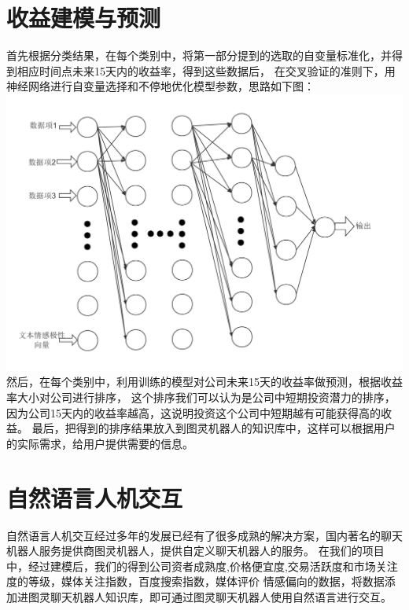 \documentclass[UTF8]{ctexart}
\begin{document}
\section{收益建模与预测}
首先根据分类结果，在每个类别中，将第一部分提到的选取的自变量标准化，并得到相应时间点未来15天内的收益率，得到这些数据后，
在交叉验证的准则下，用神经网络进行自变量选择和不停地优化模型参数，思路如下图：\\
\includegraphics[scale=0.3]{pic1.pdf}
\\然后，在每个类别中，利用训练的模型对公司未来15天的收益率做预测，根据收益率大小对公司进行排序，
这个排序我们可以认为是公司中短期投资潜力的排序，因为公司15天内的收益率越高，这说明投资这个公司中短期越有可能获得高的收益。
最后，把得到的排序结果放入到图灵机器人的知识库中，这样可以根据用户的实际需求，给用户提供需要的信息。
\section{自然语言人机交互}
自然语言人机交互经过多年的发展已经有了很多成熟的解决方案，国内著名的聊天机器人服务提供商图灵机器人，提供自定义聊天机器人的服务。
在我们的项目中，经过建模后，我们的得到公司资者成熟度,价格便宜度,交易活跃度和市场关注度的等级，媒体关注指数，百度搜索指数，媒体评价
情感偏向的数据，将数据添加进图灵聊天机器人知识库，即可通过图灵聊天机器人使用自然语言进行交互。



\end{document}
